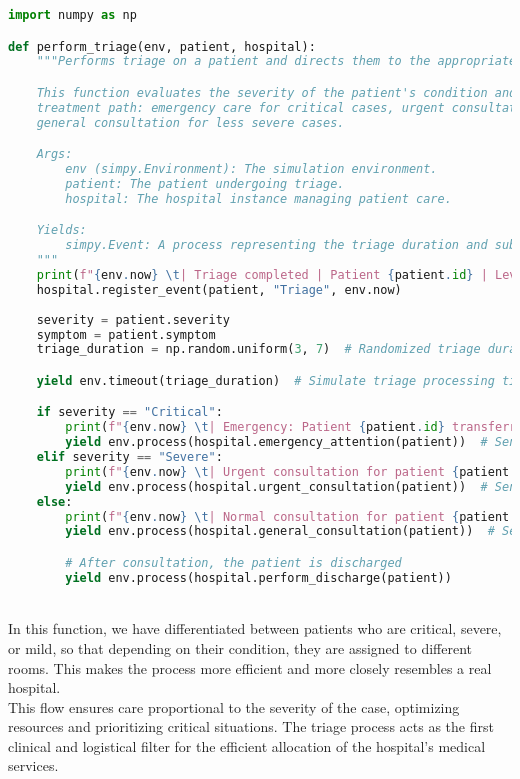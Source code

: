 \documentclass[a4paper,12pt]{article}
\begin{document}
\begin{lstlisting}[language=Python]
import numpy as np

def perform_triage(env, patient, hospital):
    """Performs triage on a patient and directs them to the appropriate care level.

    This function evaluates the severity of the patient's condition and assigns them to the correct 
    treatment path: emergency care for critical cases, urgent consultation for severe cases, or 
    general consultation for less severe cases.

    Args:
        env (simpy.Environment): The simulation environment.
        patient: The patient undergoing triage.
        hospital: The hospital instance managing patient care.

    Yields:
        simpy.Event: A process representing the triage duration and subsequent patient care actions.
    """
    print(f"{env.now} \t| Triage completed | Patient {patient.id} | Level: {patient.severity}")
    hospital.register_event(patient, "Triage", env.now)
    
    severity = patient.severity
    symptom = patient.symptom
    triage_duration = np.random.uniform(3, 7)  # Randomized triage duration

    yield env.timeout(triage_duration)  # Simulate triage processing time

    if severity == "Critical":
        print(f"{env.now} \t| Emergency: Patient {patient.id} transferred to emergency care.")
        yield env.process(hospital.emergency_attention(patient))  # Send to emergency care
    elif severity == "Severe":
        print(f"{env.now} \t| Urgent consultation for patient {patient.id}.")
        yield env.process(hospital.urgent_consultation(patient))  # Send to urgent consultation
    else:
        print(f"{env.now} \t| Normal consultation for patient {patient.id}.")
        yield env.process(hospital.general_consultation(patient))  # Send to general consultation

        # After consultation, the patient is discharged
        yield env.process(hospital.perform_discharge(patient))

\end{lstlisting}
\\
In this function, we have differentiated between patients who are critical, severe, or mild, so that depending on their condition, they are assigned to different rooms. This makes the process more efficient and more closely resembles a real hospital.\newline
\\
This flow ensures care proportional to the severity of the case, optimizing resources and prioritizing critical situations. The triage process acts as the first clinical and logistical filter for the efficient allocation of the hospital's medical services.
\end{document}
